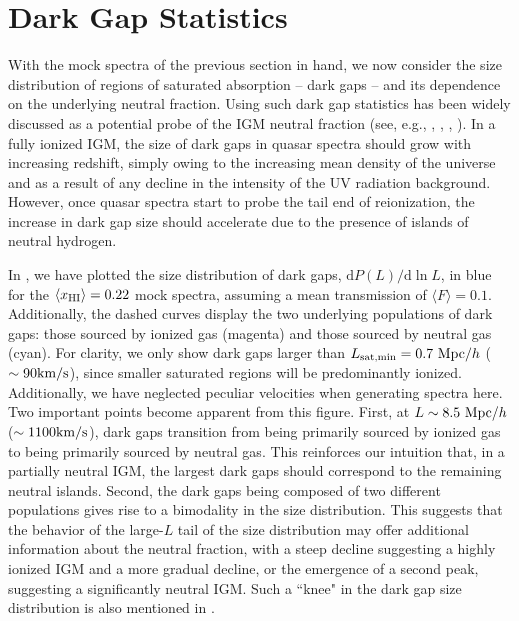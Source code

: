 \section{Dark Gap Statistics} \label{sec:NeutralIslandsHIDistributions}


With the mock spectra of the previous section in hand, we now consider the size distribution of regions of saturated absorption -- dark gaps -- and its dependence on the underlying neutral fraction. Using such dark gap statistics has been widely discussed as a potential probe of the IGM neutral fraction (see, e.g., \citealt{Fan:2005es}, \citealt{Gallerani:2005mf}, \citealt{2010MNRAS.407.1328M}, \citealt{McGreer:2011dm}). In a fully ionized IGM, the size of dark gaps in quasar spectra should grow with increasing redshift, simply owing to the increasing mean density of the universe and as a result of any decline in the intensity of the UV radiation background. However, once quasar spectra start to probe the tail end of reionization, the increase in dark gap size should accelerate due to the presence of islands of neutral hydrogen. 

In , we have plotted the size distribution of dark gaps, $\text{d}P(L)/\text{d}\ln L$, in blue for the $\langle x_{\text{HI}}\rangle = 0.22$ mock spectra, assuming a mean transmission of $\langle F \rangle = 0.1$. Additionally, the dashed curves display the two underlying populations of dark gaps: those sourced by ionized gas (magenta) and those sourced by neutral gas (cyan). For clarity, we only show dark gaps larger than $L_{\text{sat,min}} = 0.7\ \text{Mpc/$h$}$ ($\sim 90 \text{km}/\text{s}$), since smaller saturated regions will be predominantly ionized. Additionally, we have neglected peculiar velocities when generating spectra here. Two important points become apparent from this figure. First, at $ L \sim 8.5\ \text{Mpc/$h$}$ ($\sim 1100 \text{km}/\text{s}$), dark gaps transition from being primarily sourced by ionized gas to being primarily sourced by neutral gas. This reinforces our intuition that, in a partially neutral IGM, the largest dark gaps should correspond to the remaining neutral islands. Second, the dark gaps being composed of two different populations gives rise to a bimodality in the size distribution. This suggests that the behavior of the large-$L$ tail of the size distribution may offer additional information about the neutral fraction, with a steep decline suggesting a highly ionized IGM and a more gradual decline, or the emergence of a second peak, suggesting a significantly neutral IGM. Such a ``knee" in the dark gap size distribution is also mentioned in \citet{2010MNRAS.407.1328M}.


